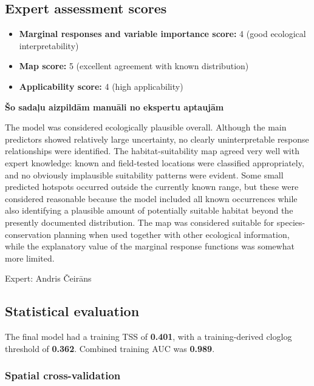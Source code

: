 \documentclass[
  openany]{book}
\providecommand{\tightlist}{%
  \setlength{\itemsep}{0pt}\setlength{\parskip}{0pt}}
\providecommand{\tightlist}{%
  \setlength{\itemsep}{0pt}%
  \setlength{\parskip}{0pt}%
}
\begin{document}
\subsection*{Expert assessment scores}\label{expert-assessment-scores-25}

\begin{itemize}
\tightlist
\item
  \textbf{Marginal responses and variable importance score:} 4 (good ecological interpretability)
\item
  \textbf{Map score:} 5 (excellent agreement with known distribution)
\item
  \textbf{Applicability score:} 4 (high applicability)
\end{itemize}

\textbf{Šo sadaļu aizpildām manuāli no ekspertu aptaujām}

The model was considered ecologically plausible overall. Although the main
predictors showed relatively large uncertainty, no clearly uninterpretable
response relationships were identified. The habitat-suitability map agreed very
well with expert knowledge: known and field-tested locations were classified
appropriately, and no obviously implausible suitability patterns were evident.
Some small predicted hotspots occurred outside the currently known range, but
these were considered reasonable because the model included all known occurrences
while also identifying a plausible amount of potentially suitable habitat beyond
the presently documented distribution. The map was considered suitable for
species-conservation planning when used together with other ecological
information, while the explanatory value of the marginal response functions
was somewhat more limited.

Expert: Andris Čeirāns

\subsection*{Statistical evaluation}\label{statistical-evaluation-25}

The final model had a training TSS of \textbf{0.401}, with a training-derived cloglog threshold of \textbf{0.362}. Combined training AUC was \textbf{0.989}.

\subsubsection*{Spatial cross-validation}\label{spatial-cross-validation-25}
\end{document}
